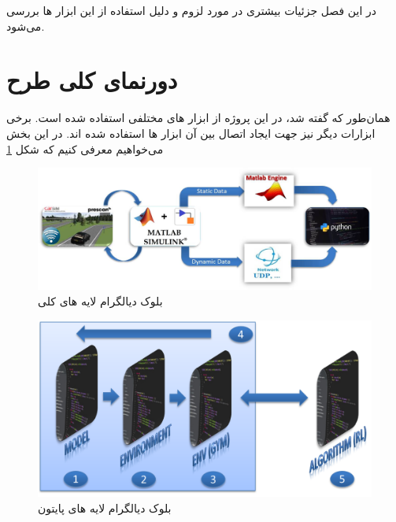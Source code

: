 در این فصل جزئیات بیشتری در مورد لزوم و دلیل استفاده از این ابزار ها بررسی می‌شود.


\section{دورنمای کلی طرح}
همان‌طور که گفته شد، در این پروژه از ابزار های مختلفی استفاده شده است. برخی ابزارات دیگر نیز جهت ایجاد اتصال بین آن ابزار ها استفاده شده اند. در این بخش می‌خواهیم معرفی کنیم که 
 شکل 
\ref{fig:block-diagram}

\begin{figure}[h!]
	\centering
	\includegraphics[width=1\linewidth]{Figures/block-diagram-white}
	\caption{بلوک دیالگرام لایه های کلی}
	\label{fig:block-diagram}
\end{figure}

\begin{figure}[h!]
	\centering
	\includegraphics[width=0.7\linewidth]{Figures/python-layers-white}
	\caption{بلوک دیالگرام لایه های پایتون}
	\label{fig:python-layers}
\end{figure}






